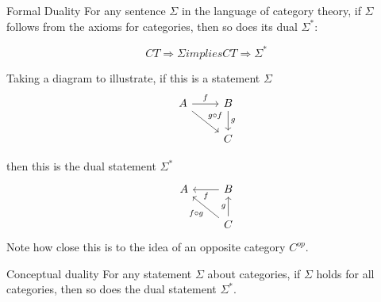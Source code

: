 \begin{proposition}{Formal Duality}
  For any sentence $\Sigma$ in the language of category theory, if $\Sigma$
  follows from the axioms for categories, then so does its dual $\Sigma^*$:

  $$ CT \Rightarrow \Sigma implies CT \Rightarrow \Sigma^* $$
\end{proposition}

Taking a diagram to illustrate, if this is a statement $\Sigma$
\[
  \begin{tikzcd}
    A \arrow[r, "f"] \arrow[dr, "g \circ f"] & B \arrow[d, "g"] \\
    & C
  \end{tikzcd}
\]

then this is the dual statement $\Sigma^*$
\[
  \begin{tikzcd}
    A  & B \arrow[l, "f"] \\
    & C \arrow[ul, "f \circ g"] \arrow[u, "g"]
  \end{tikzcd}
\]
Note how close this is to the idea of an opposite category $C^{op}$.

\begin{proposition}{Conceptual duality}
  For any statement $\Sigma$ about categories, if $\Sigma$ holds for
  all categories, then so does the dual statement $\Sigma^*$.
\end{proposition}